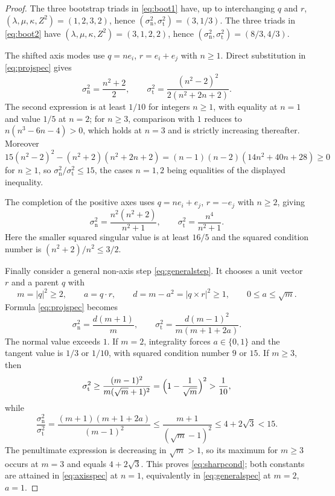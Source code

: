\documentclass[11pt]{article}
\theoremstyle{definition}
\theoremstyle{remark}
\theoremstyle{plain}
\begin{document}
\begin{proof}
The three bootstrap triads in \eqref{eq:boot1} have, up to interchanging $q$
and $r$, $(\lambda,\mu,\kappa,Z^{2})=(1,2,3,2)$, hence
$(\sigma_{\mathrm n}^{2},\sigma_{\mathrm t}^{2})=(3,1/3)$. The three triads in
\eqref{eq:boot2} have $(\lambda,\mu,\kappa,Z^{2})=(3,1,2,2)$, hence
$(\sigma_{\mathrm n}^{2},\sigma_{\mathrm t}^{2})=(8/3,4/3)$.

The shifted axis modes use $q=ne_{i}$, $r=e_{i}+e_{j}$ with $n\ge1$. Direct
substitution in \eqref{eq:projspec} gives
\begin{equation}
\label{eq:axisspec}
\sigma_{\mathrm n}^{2}=\frac{n^{2}+2}{2},
\qquad
\sigma_{\mathrm t}^{2}=\frac{(n^{2}-2)^{2}}{2(n^{2}+2n+2)} .
\end{equation}
The second expression is at least $1/10$ for integers $n\ge1$, with equality at
$n=1$ and value $1/5$ at $n=2$; for $n\ge3$, comparison with $1$ reduces to
$n(n^{3}-6n-4)>0$, which holds at $n=3$ and is strictly increasing thereafter.
Moreover
\[
15(n^{2}-2)^{2}-(n^{2}+2)(n^{2}+2n+2)
=(n-1)(n-2)(14n^{2}+40n+28)\ge0
\]
for $n\ge1$, so $\sigma_{\mathrm n}^{2}/\sigma_{\mathrm t}^{2}\le15$, the cases
$n=1,2$ being equalities of the displayed inequality.

The completion of the positive axes uses $q=ne_{i}+e_{j}$, $r=-e_{j}$ with
$n\ge2$, giving
\begin{equation}
\label{eq:axisspec2}
\sigma_{\mathrm n}^{2}=\frac{n^{2}(n^{2}+2)}{n^{2}+1},
\qquad
\sigma_{\mathrm t}^{2}=\frac{n^{4}}{n^{2}+1} .
\end{equation}
Here the smaller squared singular value is at least $16/5$ and the squared
condition number is $(n^{2}+2)/n^{2}\le3/2$.

Finally consider a general non-axis step \eqref{eq:generalstep}. It chooses a
unit vector $r$ and a parent $q$ with
\[
m=|q|^{2}\ge2,
\qquad
a=q\cdot r,
\qquad
d=m-a^{2}=|q\times r|^{2}\ge1,
\qquad
0\le a\le\sqrt m .
\]
Formula \eqref{eq:projspec} becomes
\begin{equation}
\label{eq:generalspec}
\sigma_{\mathrm n}^{2}=\frac{d(m+1)}m,
\qquad
\sigma_{\mathrm t}^{2}=\frac{d(m-1)^{2}}{m(m+1+2a)} .
\end{equation}
The normal value exceeds $1$. If $m=2$, integrality forces $a\in\{0,1\}$ and
the tangent value is $1/3$ or $1/10$, with squared condition number $9$ or
$15$. If $m\ge3$, then
\[
\sigma_{\mathrm t}^{2}
\ge\frac{(m-1)^{2}}{m(\sqrt m+1)^{2}}
=\Bigl(1-\frac1{\sqrt m}\Bigr)^{2}>\frac1{10},
\]
while
\[
\frac{\sigma_{\mathrm n}^{2}}{\sigma_{\mathrm t}^{2}}
=\frac{(m+1)(m+1+2a)}{(m-1)^{2}}
\le\frac{m+1}{(\sqrt m-1)^{2}}
\le4+2\sqrt3<15 .
\]
The penultimate expression is decreasing in $\sqrt m>1$, so its maximum for
$m\ge3$ occurs at $m=3$ and equals $4+2\sqrt3$. This proves
\eqref{eq:sharpcond}; both constants are attained in \eqref{eq:axisspec} at
$n=1$, equivalently in \eqref{eq:generalspec} at $m=2$, $a=1$.
\end{proof}
\end{document}

